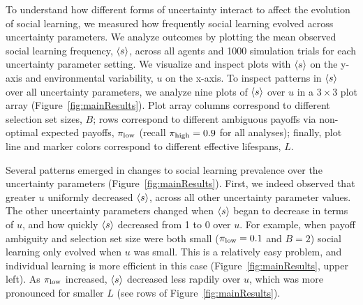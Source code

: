 \documentclass[letterpaper,11.5pt]{scrartcl}
\begin{document}
To understand how different forms of uncertainty interact to affect the evolution of
social learning, we measured how frequently social learning evolved across
uncertainty parameters. We analyze outcomes by plotting the mean observed social
learning frequency, $\langle s \rangle$, across all agents and 1000 simulation trials for each
uncertainty parameter setting.  We visualize and inspect plots with $\langle s \rangle$ on the
y-axis and environmental variability, $u$ on the x-axis. 
To inspect patterns in $\langle s \rangle$ over all uncertainty parameters, we analyze nine
plots of $\langle s \rangle$ over $u$ in a $3\times3$ plot array
(Figure~\ref{fig:mainResults}).  Plot array columns correspond to different
selection set sizes, $B$; rows correspond to different ambiguous payoffs via
non-optimal expected payoffs, $\pi_{\mathrm{low}}$ (recall $\pi_{\mathrm{high}}=0.9$ for all analyses);
finally, plot line and marker colors correspond to different effective lifespans,
$L$.  

Several patterns emerged in changes to social learning prevalence over
the uncertainty parameters (Figure~\ref{fig:mainResults}). 
First, we indeed observed that greater $u$ uniformly decreased
$\langle s \rangle$, across all other uncertainty parameter values. The other uncertainty
parameters changed when $\langle s \rangle$ began to decrease in terms of $u$,
and how quickly $\langle s \rangle$ decreased from 1 to 0 over $u$. For example, 
when payoff ambiguity and selection set size were
both small ($\pi_{\mathrm{low}} = 0.1$ and $B=2$) social learning only evolved when $u$ was
small.
This is a relatively easy problem, and individual learning is more
efficient in this case (Figure~\ref{fig:mainResults}, upper left).
As $\pi_{\mathrm{low}}$ increased, $\langle s \rangle$ decreased less rapdily over $u$, 
which was more pronounced for smaller $L$ (see rows of Figure~\ref{fig:mainResults}).  
\end{document}
